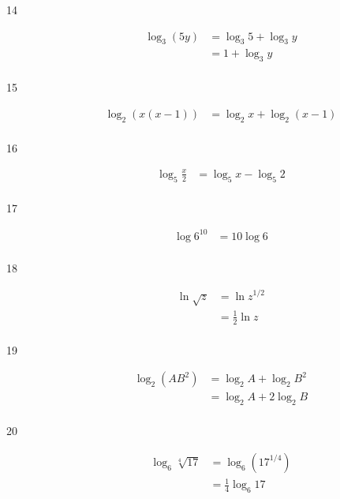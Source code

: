 \documentclass{exam}
\begin{document}
\begin{description}
      \item[14] 
        \begin{align*}
          \log_3 \left( 5y \right) &= \log_3 5 + \log_3 y \\
                                   &= 1 + \log_3 y \\
        \end{align*}

      \item[15] 
        \begin{align*}
          \log_2 (x (x - 1)) &= \log_2 x + \log_2 (x - 1) \\
        \end{align*}

      \item[16] 
        \begin{align*}
          \log_5 \frac{x}{2} &= \log_5 x - \log_5 2 \\
        \end{align*}

      \item[17] 
        \begin{align*}
          \log 6^{10} &= 10 \log 6 \\
        \end{align*}

      \item[18] 
        \begin{align*}
          \ln \sqrt{z} &= \ln z^{1/2} \\
                       &= \frac{1}{2} \ln z \\
        \end{align*}

      \item[19] 
        \begin{align*}
          \log_2 \left( AB^2 \right) &= \log_2 A + \log_2 B^2 \\
                                     &= \log_2 A + 2 \log_2 B \\
        \end{align*}

      \item[20] 
        \begin{align*}
          \log_6 \sqrt[4]{17} &= \log_6 \left( 17^{1/4} \right) \\
                              &= \frac{1}{4} \log_6 17 \\
        \end{align*}


\end{description}
\end{document}
